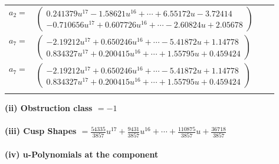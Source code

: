 \documentclass[1p]{elsarticle_modified}
\theoremstyle{definition}
\begin{document}
\begin{tabular}{m{7pt} m{180pt} m{7pt} m{180pt} }
\flushright $a_{2}=$&$\begin{pmatrix}0.241379 u^{17}-1.58621 u^{16}+\cdots+6.55172 u-3.72414\\-0.710656 u^{17}+0.607726 u^{16}+\cdots-2.60824 u+2.05678\end{pmatrix}$ \\
\flushright $a_{7}=$&$\begin{pmatrix}-2.19212 u^{17}+0.650246 u^{16}+\cdots-5.41872 u+1.14778\\0.834327 u^{17}+0.200415 u^{16}+\cdots+1.55795 u+0.459424\end{pmatrix}$\\ \flushright $a_{7}=$&$\begin{pmatrix}-2.19212 u^{17}+0.650246 u^{16}+\cdots-5.41872 u+1.14778\\0.834327 u^{17}+0.200415 u^{16}+\cdots+1.55795 u+0.459424\end{pmatrix}$\\&\end{tabular}
\flushleft \textbf{(ii) Obstruction class $= -1$}\\~\\
\flushleft \textbf{(iii) Cusp Shapes $= \frac{54335}{3857} u^{17}+\frac{9431}{3857} u^{16}+\cdots+\frac{110875}{3857} u+\frac{36718}{3857}$}\\~\\
\newpage\renewcommand{\arraystretch}{1}
\flushleft \textbf{(iv) u-Polynomials at the component}\newline \\
\end{document}

